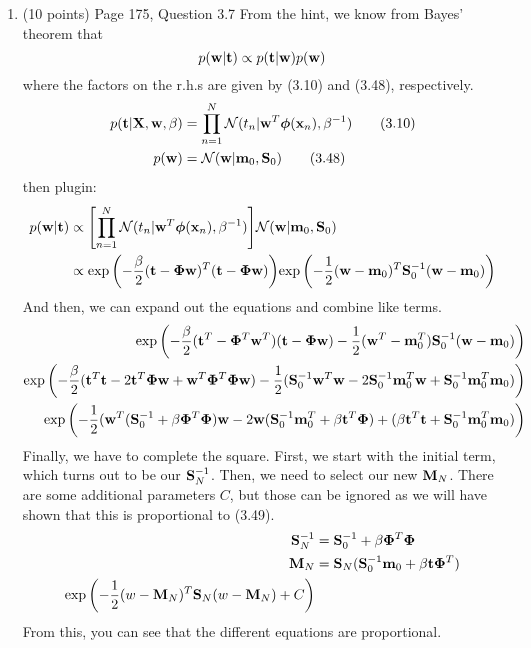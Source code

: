 \documentclass[11pt]{article}
\begin{document}
\begin{enumerate}
\item (10 points) Page 175, Question 3.7
From the hint, we know from Bayes' theorem that
$$
p(\mathbf{w} | \mathbf{t}) \propto p(\mathbf{t} | \mathbf{w}) p(\mathbf{w})
$$
where the factors on the r.h.s are given by (3.10) and (3.48), respectively. 
\begin{align*}
p(\mathbf{t} | \mathbf X, \mathbf{w}, \beta ) &= \prod_{n=1}^N \mathcal N (t_n | \mathbf{w}^T \bm{\phi}(\mathbf{x}_n), \beta^{-1} )  \tag {3.10}\\
p(\mathbf{w}) &= \mathcal N (\mathbf{w}| \mathbf m_0, \mathbf{S}_0) \tag {3.48}
\end{align*}
then plugin: 
\begin{align*}
p(\mathbf{w} | \mathbf{t}) 
&\propto 
{\color{black}\left[ \prod_{n=1}^N \mathcal N(t_n | \mathbf{w}^T \bm{\phi}(\mathbf{x}_n), \beta^{-1}) \right]}
{\color{black}\mathcal N (\mathbf{w}| \mathbf m_0, \mathbf{S}_0)}\\
&\propto 
{\color{black}\exp\left( -\frac{\beta}{2} (\mathbf{t}- \bm{\Phi}\mathbf{w})^T (\mathbf{t}- \bm{\Phi}\mathbf{w}) \right) }
{\color{black}\exp\left( -\frac{1}{2}(\mathbf{w}- \mathbf m_0)^T \mathbf{S}_0^{-1} (\mathbf{w}- \mathbf m_0) \right)}
\end{align*}
And then, we can expand out the equations and combine like terms. 
\begin{align*}
{\color{black}\exp\left( -\frac{\beta}{2} (\mathbf{t}^T - \bm{\Phi}^T \mathbf{w}^T) (\mathbf{t}- \bm{\Phi}\mathbf{w}) -\frac{1}{2}(\mathbf{w}^T - \mathbf m_0^T) \mathbf{S}_0^{-1} (\mathbf{w}- \mathbf m_0) \right)}\\
{\color{black}\exp\left( -\frac{\beta}{2} (\mathbf{t}^T \mathbf{t} - 2\mathbf{t}^T \bm{\Phi} \mathbf{w} + \mathbf{w}^T \bm{\Phi}^T \bm{\Phi} \mathbf{w}) -\frac{1}{2}(\mathbf{S}_0^{-1} \mathbf{w}^T \mathbf{w} - 2\mathbf{S}_0^{-1} \mathbf m_0^T \mathbf{w} + \mathbf{S}_0^{-1} \mathbf m_0^T \mathbf m_0) \right)}\\
{\color{black}\exp\left( -\frac{1}{2} ( \mathbf{w}^T( \mathbf{S}_0^{-1} + \beta \bm{\Phi}^T \bm{\Phi})\mathbf{w}  - 2 \mathbf{w}( \mathbf{S}_0^{-1} \mathbf m_0^T + \beta \mathbf{t}^T \bm{\Phi} ) + (\beta \mathbf{t}^T \mathbf{t} + \mathbf{S}_0^{-1} \mathbf m_0^T \mathbf m_0) \right)}\\
\end{align*}
Finally, we have to complete the square. First, we start with the initial term, which turns out to be our $\mathbf{S}_N^{-1}$.
Then, we need to select our new $\mathbf{M}_N$. There are some additional parameters $C$, but those can be ignored as we will have shown
that this is proportional to (3.49).
\begin{align*}
\mathbf{S}_N^{-1} &= \mathbf{S}_0^{-1} + \beta \bm{\Phi}^T \bm{\Phi} \\
\mathbf{M}_N &= \mathbf{S}_N( \mathbf{S}_0^{-1} \mathbf m_0 + \beta \mathbf{t} \bm{\Phi}^T )\\
{\color{black}\exp\left( -\frac{1}{2} (w - \mathbf{M}_N)^T \mathbf{S}_N (w - \mathbf{M}_N) + C\right)}\\
\end{align*}
From this, you can see that the different equations are proportional.


\end{enumerate}
\end{document}
